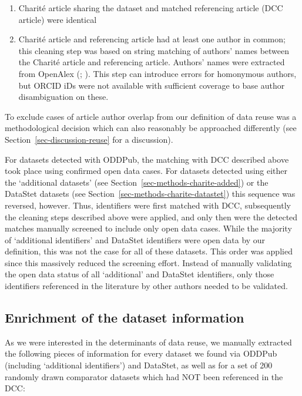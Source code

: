 \documentclass[
  letterpaper,
  DIV=11,
  numbers=noendperiod]{scrartcl}
\begin{document}
\begin{enumerate}
\def\labelenumi{(\arabic{enumi})}
\item
  Charité article sharing the dataset and matched referencing article
  (DCC article) were identical
\item
  Charité article and referencing article had at least one author in
  common; this cleaning step was based on string matching of authors'
  names between the Charité article and referencing article. Authors'
  names were extracted from OpenAlex
  (; ). This step
  can introduce errors for homonymous authors, but ORCID iDs were not
  available with sufficient coverage to base author disambiguation on
  these.
\end{enumerate}

To exclude cases of article author overlap from our definition of data
reuse was a methodological decision which can also reasonably be
approached differently (see Section~\ref{sec-discussion-reuse} for a
discussion).

For datasets detected with ODDPub, the matching with DCC described above
took place using confirmed open data cases. For datasets detected using
either the `additional datasets' (see
Section~\ref{sec-methods-charite-added}) or the DataStet datasets (see
Section~\ref{sec-methods-charite-datastet}) this sequence was reversed,
however. Thus, identifiers were first matched with DCC, subsequently the
cleaning steps described above were applied, and only then were the
detected matches manually screened to include only open data cases.
While the majority of `additional identifiers' and DataStet identifiers
were open data by our definition, this was not the case for all of these
datasets. This order was applied since this massively reduced the
screening effort. Instead of manually validating the open data status of
all `additional' and DataStet identifiers, only those identifiers
referenced in the literature by other authors needed to be validated.

\subsection{Enrichment of the dataset
information}\label{sec-methods-metadata}

As we were interested in the determinants of data reuse, we manually
extracted the following pieces of information for every dataset we found
via ODDPub (including `additional identifiers') and DataStet, as well as
for a set of 200 randomly drawn comparator datasets which had NOT been
referenced in the DCC:
\end{document}
